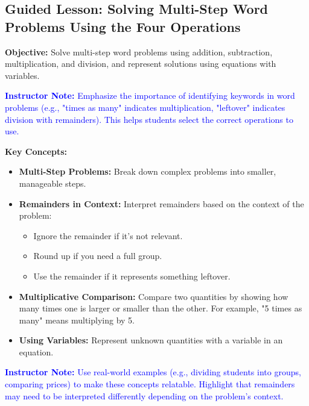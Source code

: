 \documentclass[12pt]{article}
\title{}
\date{}
\begin{document}
\subsection*{Guided Lesson: Solving Multi-Step Word Problems Using the Four Operations}
\onehalfspacing

\begin{tcolorbox}[colframe=black!40, colback=gray!5, 
coltitle=black, colbacktitle=black!20, fonttitle=\bfseries\Large, 
title=Learning Objective, halign title=center, left=5pt, right=5pt, top=5pt, bottom=15pt]
\textbf{Objective:} Solve multi-step word problems using addition, subtraction, multiplication, and division, and represent solutions using equations with variables.

\textcolor{blue}{\textbf{Instructor Note:} Emphasize the importance of identifying keywords in word problems (e.g., "times as many" indicates multiplication, "leftover" indicates division with remainders). This helps students select the correct operations to use.}
\end{tcolorbox}

\begin{tcolorbox}[colframe=black!60, colback=white, 
coltitle=black, colbacktitle=black!15, fonttitle=\bfseries\Large, 
title=Key Concepts and Vocabulary, halign title=center, left=10pt, right=10pt, top=10pt, bottom=15pt]
\textbf{Key Concepts:}
\begin{itemize}
    \item \textbf{Multi-Step Problems:} Break down complex problems into smaller, manageable steps.
    \item \textbf{Remainders in Context:} Interpret remainders based on the context of the problem:
    \begin{itemize}
        \item Ignore the remainder if it's not relevant.
        \item Round up if you need a full group.
        \item Use the remainder if it represents something leftover.
    \end{itemize}
    \item \textbf{Multiplicative Comparison:} Compare two quantities by showing how many times one is larger or smaller than the other. For example, "5 times as many" means multiplying by 5.
    \item \textbf{Using Variables:} Represent unknown quantities with a variable in an equation.
\end{itemize}

\textcolor{blue}{\textbf{Instructor Note:} Use real-world examples (e.g., dividing students into groups, comparing prices) to make these concepts relatable. Highlight that remainders may need to be interpreted differently depending on the problem's context.}
\end{tcolorbox}
\end{document}
